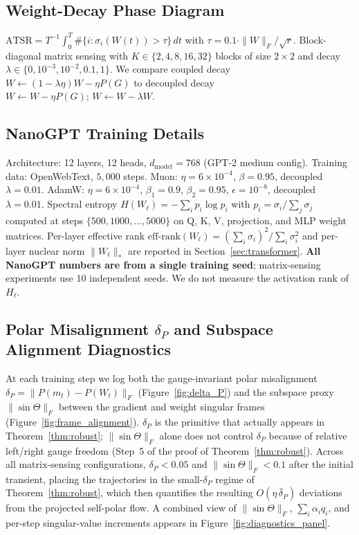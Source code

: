 \documentclass{article}
\begin{document}
\subsection{Weight-Decay Phase Diagram}
$\mathrm{ATSR} = T^{-1}\int_0^T \#\{i:\sigma_i(W(t))>\tau\}\,dt$ with $\tau = 0.1\cdot\|W\|_F/\sqrt r$. Block-diagonal matrix sensing with $K\in\{2,4,8,16,32\}$ blocks of size $2\times 2$ and decay $\lambda\in\{0,10^{-3},10^{-2},0.1,1\}$. We compare coupled decay $W\!\leftarrow\!(1-\lambda\eta)W-\eta P(G)$ to decoupled decay $W\!\leftarrow\!W-\eta P(G);\,W\!\leftarrow\!W-\lambda W$.

\subsection{NanoGPT Training Details}
Architecture: 12 layers, 12 heads, $d_{\mathrm{model}}=768$ (GPT-2 medium config). Training data: OpenWebText, $5{,}000$ steps. Muon: $\eta=6\times 10^{-4}$, $\beta=0.95$, decoupled $\lambda=0.01$. AdamW: $\eta=6\times 10^{-4}$, $\beta_1=0.9$, $\beta_2=0.95$, $\epsilon=10^{-8}$, decoupled $\lambda=0.01$. Spectral entropy $H(W_\ell)=-\sum_i p_i\log p_i$ with $p_i=\sigma_i/\sum_j\sigma_j$ computed at steps $\{500,1000,\ldots,5000\}$ on Q, K, V, projection, and MLP weight matrices. Per-layer effective rank $\mathrm{eff\text{-}rank}(W_\ell) = (\sum_i\sigma_i)^2/\sum_i\sigma_i^2$ and per-layer nuclear norm $\|W_\ell\|_*$ are reported in Section~\ref{sec:transformer}. \textbf{All NanoGPT numbers are from a single training seed}; matrix-sensing experiments use 10 independent seeds. We do not measure the activation rank of $H_\ell$.

\subsection{Polar Misalignment $\delta_P$ and Subspace Alignment Diagnostics}
At each training step we log both the gauge-invariant polar misalignment $\delta_P=\|P(m_t)-P(W_t)\|_F$ (Figure~\ref{fig:delta_P}) and the subspace proxy $\|\sin\Theta\|_F$ between the gradient and weight singular frames (Figure~\ref{fig:frame_alignment}). $\delta_P$ is the primitive that actually appears in Theorem~\ref{thm:robust}; $\|\sin\Theta\|_F$ alone does not control $\delta_P$ because of relative left/right gauge freedom (Step~5 of the proof of Theorem~\ref{thm:robust}). Across all matrix-sensing configurations, $\delta_P<0.05$ and $\|\sin\Theta\|_F<0.1$ after the initial transient, placing the trajectories in the small-$\delta_P$ regime of Theorem~\ref{thm:robust}, which then quantifies the resulting $O(\eta\,\bar\delta_P)$ deviations from the projected self-polar flow. A combined view of $\|\sin\Theta\|_F$, $\sum_i\alpha_i q_i$, and per-step singular-value increments appears in Figure~\ref{fig:diagnostics_panel}.
\end{document}
